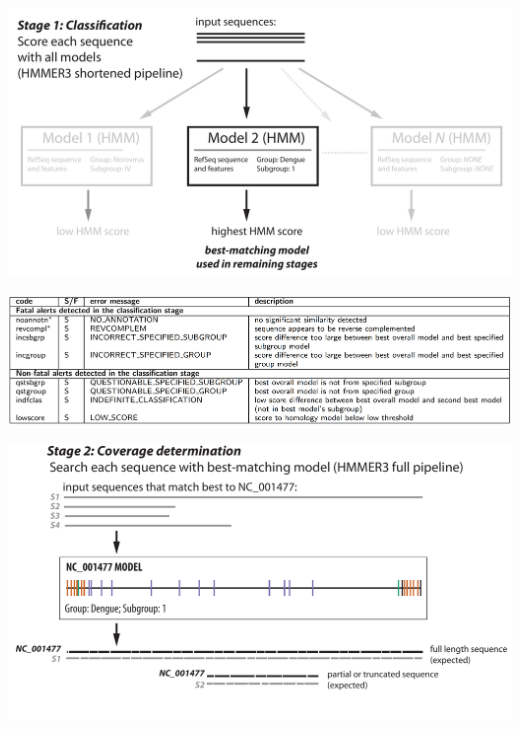 \documentclass[landscape]{slides}
\begin{document}
\begin{slide}
\begin{center}

\includegraphics[width=9.5in]{figs/v-annotate-stage1-2}

\includegraphics[width=10.5in]{figs/ss-class-alert-list}

\end{center}
\vfill
\end{slide}
\begin{slide}
\begin{center}

\includegraphics[width=10.5in]{figs/v-annotate-stage2-1}

\end{center}
\vfill
\end{slide}
\end{document}
